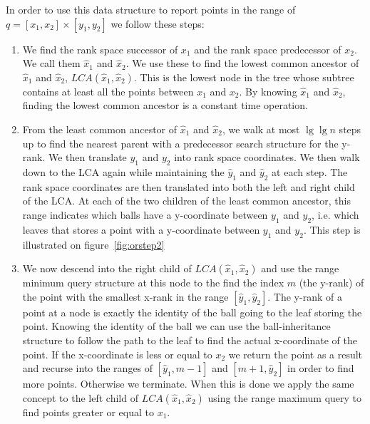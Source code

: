 \noindent In order to use this data structure to report points in the range of $q = [x_1, x_2] \times [y_1, y_2]$ we follow these steps:
\begin{enumerate}
  \item We find the rank space successor of $x_1$ and the rank space predecessor of $x_2$. We call them $\hat{x}_1$ and $\hat{x}_2$. We use these to find the lowest common ancestor of $\hat{x}_1$ and $\hat{x}_2$, $LCA(\hat{x}_1, \hat{x}_2)$. This is the lowest node in the tree whose subtree contains at least all the points between $x_1$ and $x_2$. By knowing $\hat{x}_1$ and $\hat{x}_2$, finding the lowest common ancestor is a constant time operation.   
  \item From the least common ancestor of $\hat{x}_1$ and $\hat{x}_2$, we walk at most $\lg \lg n$ steps up to find the nearest parent with a predecessor search structure for the y-rank. We then translate $y_1$ and $y_2$ into rank space coordinates. We then walk down to the LCA again while maintaining the $\hat{y}_1$ and $\hat{y}_2$ at each step. The rank space coordinates are then translated into both the left and right child of the LCA. At each of the two children of the least common ancestor, this range indicates which balls have a y-coordinate between $y_1$ and $y_2$, i.e. which leaves that stores a point with a y-coordinate between $y_1$ and $y_2$. This step is illustrated on figure~\ref{fig:orstep2}
  \item We now descend into the right child of $LCA(\hat{x}_1, \hat{x}_2)$ and use the range minimum query structure at this node to the find the index $m$ (the y-rank) of the point with the smallest x-rank in the range $[\hat{y}_1, \hat{y}_2]$. The y-rank of a point at a node is exactly the identity of the ball going to the leaf storing the point. Knowing the identity of the ball we can use the ball-inheritance structure to follow the path to the leaf to find the actual x-coordinate of the point. If the x-coordinate is less or equal to $x_2$ we return the point as a result and recurse into the ranges of $[\hat{y}_1, m-1]$ and $[m+1, \hat{y}_2]$ in order to find more points. Otherwise we terminate. When this is done we apply the same concept to the left child of $LCA(\hat{x}_1, \hat{x}_2)$ using the range maximum query to find points greater or equal to $x_1$.
\end{enumerate}


